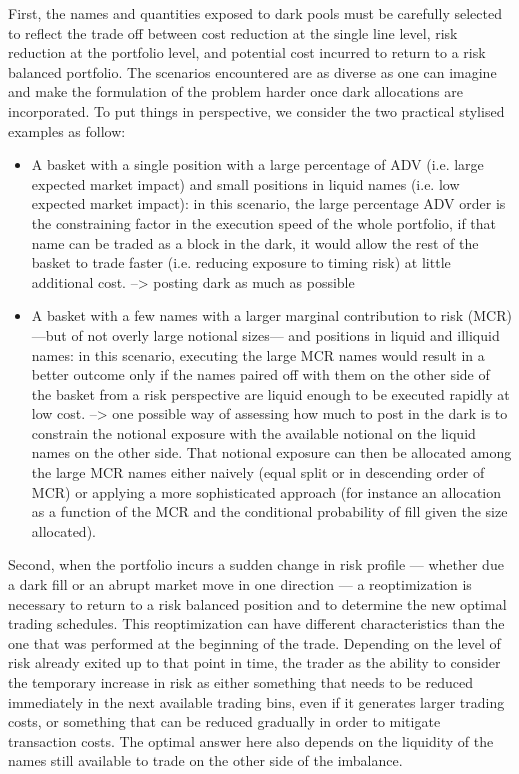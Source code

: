 First, the names and quantities exposed to dark pools must be carefully selected to reflect the trade off between cost reduction at the single line level, risk reduction at the portfolio level, and potential cost incurred to return to a risk balanced portfolio. The scenarios encountered are as diverse as one can imagine and make the formulation of the problem harder once dark allocations are incorporated. To put things in perspective, we consider the two practical stylised examples as follow:
\begin{itemize}

\item A basket with a single position with a large percentage of ADV (i.e. large expected market impact) and small positions in liquid names (i.e. low expected market impact): in this scenario, the large percentage ADV order is the constraining factor in the execution speed of the whole portfolio, if that name can be traded as a block in the dark, it would allow the rest of the basket to trade faster (i.e. reducing exposure to timing risk) at little additional cost. --> posting dark as much as possible
\item A basket with a few names with a larger marginal contribution to risk (MCR) ---but of not overly large notional sizes--- and positions in liquid and illiquid names: in this scenario, executing the large MCR names would result in a better outcome only if the names paired off with them on the other side of the basket from a risk perspective are liquid enough to be executed rapidly at low cost. --> one possible way of assessing how much to post in the dark is to constrain the notional exposure with the available notional on the liquid names on the other side. That notional exposure can then be allocated among the large MCR names either naively (equal split or in descending order of MCR) or applying a more sophisticated approach (for instance an allocation as a function of the MCR and the conditional probability of fill given the size allocated).
\end{itemize}

Second, when the portfolio incurs a sudden change in risk profile --- whether due a dark fill or an abrupt market move in one direction --- a reoptimization is necessary to return to a risk balanced position and to determine the new optimal trading schedules. This reoptimization can have different characteristics than the one that was performed at the beginning of the trade. Depending on the level of risk already exited up to that point in time, the trader as the ability to consider the temporary increase in risk as either something that needs to be reduced immediately in the next available trading bins, even if it generates larger trading costs, or something that can be reduced gradually in order to mitigate transaction costs. The optimal answer here also depends on the liquidity of the names still available to trade on the other side of the imbalance.


